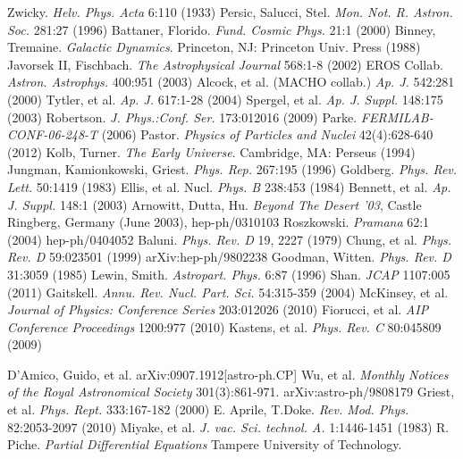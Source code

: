 \documentclass[a4paper,12pt]{article}
\begin{document}
\begin{thebibliography}{1}

 Zwicky.  \emph{Helv. Phys. Acta} 6:110 (1933)
 Persic, Salucci, Stel.  \emph{Mon. Not. R. Astron. Soc.} 281:27 (1996)
 Battaner, Florido.  \emph{Fund. Cosmic Phys.} 21:1 (2000)
 Binney, Tremaine. \emph{Galactic Dynamics}. Princeton, NJ: Princeton Univ. Press (1988)
 Javorsek II, Fischbach. \emph{The Astrophysical Journal} 568:1-8 (2002)
 EROS Collab.  \emph{Astron. Astrophys.} 400:951 (2003)
 Alcock, et al. (MACHO collab.)  \emph{Ap. J.} 542:281 (2000)
 Tytler, et al. \emph{Ap. J.} 617:1-28 (2004)
 Spergel, et al. \emph{Ap. J. Suppl.} 148:175 (2003)
 Robertson. \emph{J. Phys.:Conf. Ser.} 173:012016 (2009)
 Parke.  \emph{FERMILAB-CONF-06-248-T} (2006)
 Pastor.  \emph{Physics of Particles and Nuclei} 42(4):628-640 (2012)
 Kolb, Turner. \emph{The Early Universe}.  Cambridge, MA: Perseus (1994)
 Jungman, Kamionkowski, Griest.  \emph{Phys. Rep.} 267:195 (1996)
 Goldberg.  \emph{Phys. Rev. Lett.} 50:1419 (1983)
 Ellis, et al. Nucl. \emph{Phys. B} 238:453 (1984)
 Bennett, et al. \emph{Ap. J. Suppl.} 148:1 (2003)
 Arnowitt, Dutta, Hu. \emph{Beyond The Desert '03}, Castle Ringberg, Germany (June 2003), hep-ph/0310103
 Roszkowski.  \emph{Pramana} 62:1 (2004) hep-ph/0404052
 Baluni. \emph{Phys. Rev. D} 19, 2227 (1979)
 Chung, et al.  \emph{Phys. Rev. D} 59:023501 (1999) arXiv:hep-ph/9802238
 Goodman, Witten. \emph{Phys. Rev. D} 31:3059 (1985)
 Lewin, Smith. \emph{Astropart. Phys.} 6:87 (1996)
 Shan. \emph{JCAP} 1107:005 (2011)
 Gaitskell.  \emph{Annu. Rev. Nucl. Part. Sci.} 54:315-359 (2004)
 McKinsey, et al.  \emph{Journal of Physics: Conference Series} 203:012026 (2010) 
 Fiorucci, et al.  \emph{AIP Conference Proceedings} 1200:977 (2010)
 Kastens, et al. \emph{Phys. Rev. C} 80:045809 (2009)

 D'Amico, Guido, et al. arXiv:0907.1912[astro-ph.CP] 
 Wu, et al.  \emph{Monthly Notices of the Royal Astronomical Society} 301(3):861-971.  arXiv:astro-ph/9808179
 Griest, et al.  \emph{Phys. Rept.} 333:167-182 (2000) 
 E. Aprile, T.Doke. \emph{Rev. Mod. Phys.} 82:2053-2097 (2010)
 Miyake, et al.  \emph{J. vac. Sci. technol. A.} 1:1446-1451 (1983)
 R. Piche. \emph{Partial Differential Equations} Tampere University of Technology.



\end{thebibliography}
\end{document}
